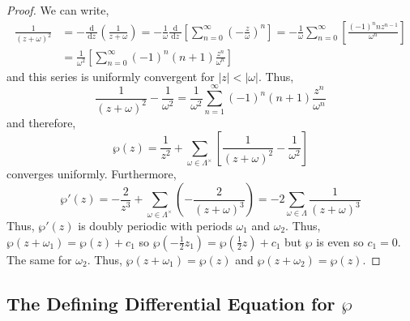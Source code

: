 \documentclass{article}
\renewcommand{\d}[1]{\: \mathrm{d}#1 \:}
\newcommand{\deriv}[2]{\frac{\d{#1}}{\d{#2}}}
\theoremstyle{definition}
\begin{document}
\begin{proof}
We can write,
\begin{align*} 
\frac{1}{(z + \omega)^2} & = - \deriv{}{z} \left( \frac{1}{z + \omega} \right) = - \frac{1}{\omega} \deriv{}{z} \left[ \sum_{n = 0}^\infty \left( - \frac{z}{\omega} \right)^n \right] = - \frac{1}{\omega} \sum_{n = 0}^\infty \left[ \frac{ (-1)^n n z^{n-1}}{\omega^{n}} \right] 
\\
& = \frac{1}{\omega^2} \left[ \sum_{n = 0}^\infty (-1)^n (n + 1) \frac{z^n}{\omega^n} \right]  
\end{align*}
and this series is uniformly convergent for $|z| < |\omega|$. Thus,
\[ \frac{1}{(z + \omega)^2} - \frac{1}{\omega^2} = \frac{1}{\omega^2} \sum_{n=1}^\infty (-1)^n (n+1) \frac{z^n}{\omega^n} \]
and therefore, 
\[ \wp(z) = \frac{1}{z^2} + \sum_{\omega \in \Lambda^\times} \left[ \frac{1}{(z + \omega)^2} - \frac{1}{\omega^2} \right] \]
converges uniformly. Furthermore, 
\[ \wp'(z) = - \frac{2}{z^3} + \sum_{\omega \in \Lambda^\times} \left( - \frac{2}{(z + \omega)^3} \right) = - 2 \sum_{\omega \in \Lambda} \frac{1}{(z + \omega)^3} \]
Thus, $\wp'(z)$ is doubly periodic with periods $\omega_1$ and $\omega_2$. Thus, $\wp(z + \omega_1) = \wp(z) + c_1$ so $\wp(-\tfrac{1}{2} z_1) = \wp(\tfrac{1}{2} z) + c_1$ but $\wp$ is even so $c_1 = 0$. The same for $\omega_2$. Thus, $\wp(z + \omega_1) = \wp(z)$ and $\wp(z + \omega_2) = \wp(z)$. 
\end{proof}


\subsection{The Defining Differential Equation for $\wp$}
\end{document}
